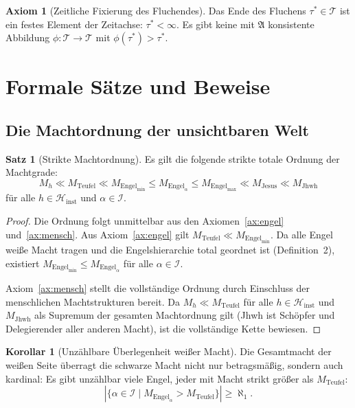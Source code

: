 ﻿\documentclass[a4paper,12pt]{article}
\theoremstyle{definition}
\newtheorem{satz}{Satz}
\newtheorem{axiom}{Axiom}
\newtheorem{korollar}{Korollar}
\begin{document}
\begin{axiom}[Zeitliche Fixierung des Fluchendes]
\label{ax:endzeit}
  Das Ende des Fluchens $\tau^* \in \mathcal{T}$ ist ein festes Element der
  Zeitachse: $\tau^* < \infty$. Es gibt keine mit $\mathfrak{A}$ konsistente
  Abbildung $\phi: \mathcal{T} \to \mathcal{T}$ mit $\phi(\tau^*) > \tau^*$.
\end{axiom}

\section{Formale Sätze und Beweise}

\subsection{Die Machtordnung der unsichtbaren Welt}

\begin{satz}[Strikte Machtordnung]
\label{satz:ordnung}
  Es gilt die folgende strikte totale Ordnung der Machtgrade:
  \[
    M_h \ll M_{\mathrm{Teufel}} \ll M_{\mathrm{Engel}_{\min}}
    \leq M_{\mathrm{Engel}_\alpha} \leq M_{\mathrm{Engel}_{\max}}
    \ll M_{\mathrm{Jesus}} \ll M_{\mathrm{Jhwh}}
  \]
  für alle $h \in \mathcal{H}_{\text{inst}}$ und $\alpha \in \mathcal{I}$.
\end{satz}

\begin{proof}
  Die Ordnung folgt unmittelbar aus den Axiomen~\ref{ax:engel} und~\ref{ax:mensch}.
  Aus Axiom~\ref{ax:engel} gilt $M_{\mathrm{Teufel}} \ll M_{\mathrm{Engel}_{\min}}$.
  Da alle Engel weiße Macht tragen und die Engelshierarchie total geordnet ist
  (Definition~2), existiert $M_{\mathrm{Engel}_{\min}} \leq M_{\mathrm{Engel}_\alpha}$
  für alle $\alpha \in \mathcal{I}$.

  Axiom~\ref{ax:mensch} stellt die vollständige Ordnung durch Einschluss der
  menschlichen Machtstrukturen bereit. Da $M_h \ll M_{\mathrm{Teufel}}$ für alle
  $h \in \mathcal{H}_{\text{inst}}$ und $M_{\mathrm{Jhwh}}$ als Supremum der
  gesamten Machtordnung gilt (Jhwh ist Schöpfer und Delegierender aller anderen
  Macht), ist die vollständige Kette bewiesen.
\end{proof}

\begin{korollar}[Unzählbare Überlegenheit weißer Macht]
\label{kor:ueberlegen}
  Die Gesamtmacht der weißen Seite überragt die schwarze Macht nicht nur betragsmäßig,
  sondern auch kardinal: Es gibt unzählbar viele Engel, jeder mit Macht strikt
  größer als $M_{\mathrm{Teufel}}$:
  \[
    |\{\alpha \in \mathcal{I} \mid M_{\mathrm{Engel}_\alpha} > M_{\mathrm{Teufel}}\}|
    \geq \aleph_1.
  \]
\end{korollar}
\end{document}
